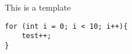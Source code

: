 \documentclass{article}
\begin{document}
This is a template
\begin{lstlisting}
for (int i = 0; i < 10; i++){
    test++;
}
\end{lstlisting}



 
\end{document}

